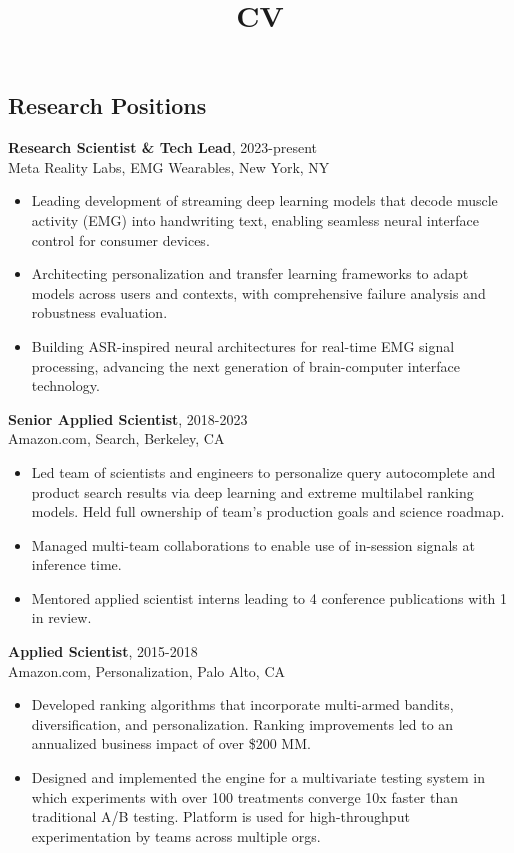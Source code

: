 \documentclass[line,11pt]{res}
\title{CV}
\begin{document}
 
\thispagestyle{empty} %
\address{246 $2^{nd}$ St. \#1401, San Francisco, CA 94105}
\address{716.771.8224}
\address{daniel.n.hill@gmail.com}
\address{www.danielnhill.com}

\begin{resume}

\section{Research Positions}
\vspace{0.1in} 

 {\bf Research Scientist \& Tech Lead}, 2023-present \\ Meta Reality Labs, EMG Wearables, New York, NY 
  \begin{itemize}
         \item[] Leading development of streaming deep learning models that decode muscle activity (EMG) into handwriting text, enabling seamless neural interface control for consumer devices.
          \item[] Architecting personalization and transfer learning frameworks to adapt models across users and contexts, with comprehensive failure analysis and robustness evaluation.
          \item[] Building ASR-inspired neural architectures for real-time EMG signal processing, advancing the next generation of brain-computer interface technology.
          \end{itemize}

 {\bf Senior Applied Scientist}, 2018-2023 \\ Amazon.com, Search, Berkeley, CA 
  \begin{itemize}
         \item[] Led team of scientists and engineers to personalize query autocomplete and product search results via deep learning and extreme multilabel ranking models. Held full ownership of team's production goals and science roadmap.
          \item[] Managed multi-team collaborations to enable use of in-session signals at inference time.
          \item[] Mentored applied scientist interns leading to 4 conference publications with 1 in review.
          \end{itemize}

 {\bf Applied Scientist}, 2015-2018 \\ Amazon.com, Personalization, Palo Alto, CA 
  \begin{itemize}
           \item[] Developed ranking algorithms that incorporate multi-armed bandits, diversification, and personalization. Ranking improvements led to an annualized business impact of over \$200 MM.
          \item[] Designed and implemented the engine for a multivariate testing system in which experiments with over 100 treatments converge 10x faster than traditional A/B testing. Platform is used for high-throughput experimentation by teams across multiple orgs. 
   \end{itemize}
   

\end{resume}
\end{document}
